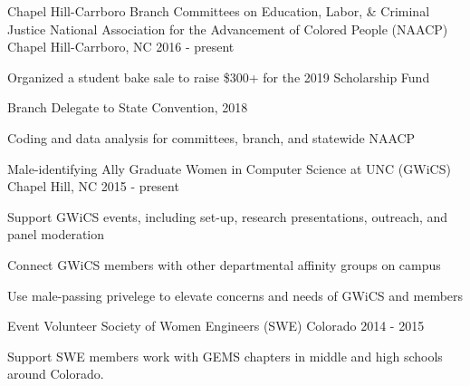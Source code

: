 
\begin{cventries}
  \cventry
    {Chapel Hill-Carrboro Branch Committees on Education, Labor, \& Criminal Justice} %
    {National Association for the Advancement of Colored People (NAACP)} %
    {Chapel Hill-Carrboro, NC} %
    {2016 - present} %
    {
      \begin{cvitems} %
        \item {Organized a student bake sale to raise \$300+ for the 2019 Scholarship Fund}
        \item {Branch Delegate to State Convention, 2018}
        \item {Coding and data analysis for committees, branch, and statewide NAACP}
      \end{cvitems}
    }
   
  \cventry
    {Male-identifying Ally} %
    {Graduate Women in Computer Science at UNC (GWiCS)} %
    {Chapel Hill, NC} %
    {2015 - present} %
    {
      \begin{cvitems} %
        \item {Support GWiCS events, including set-up, research presentations, outreach, and panel moderation}
        \item {Connect GWiCS members with other departmental affinity groups on campus}
        \item {Use male-passing privelege to elevate concerns and needs of GWiCS and members}
      \end{cvitems}
    }
    
  \cventry
    {Event Volunteer}
    {Society of Women Engineers (SWE)}
    {Colorado}
    {2014 - 2015}
    {
      \begin{cvitems} %
        \item {Support SWE members work with GEMS chapters in middle and high schools around Colorado.}
      \end{cvitems}
    }
    

\end{cventries}
